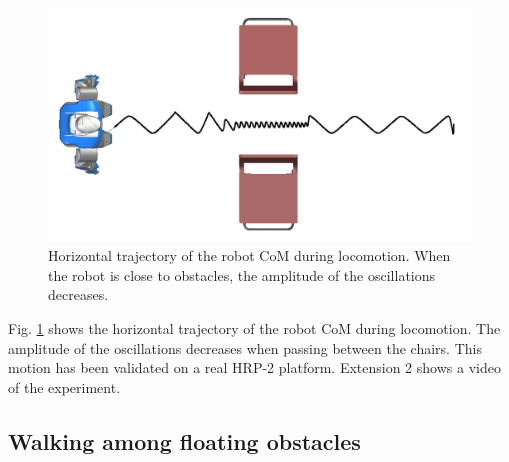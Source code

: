 \documentclass{article}
\begin{document}
\begin{figure}[h!]
\centering
\includegraphics[width=0.7\linewidth]{pics/chairs/waist-trajectory.png}

\caption{Horizontal trajectory of the robot CoM during
  locomotion. When the robot is close to obstacles, the amplitude of
  the oscillations decreases.}
\label{fig:chairs-waist}
\end{figure}



Fig.  \ref{fig:chairs-waist} shows  the horizontal  trajectory  of the
robot CoM  during  locomotion. The amplitude of the oscillations  decreases when passing
between the  chairs.  This motion has  been validated on  a real HRP-2
platform. Extension 2 shows a video of the experiment.


\subsection{Walking among floating obstacles}
\end{document}
